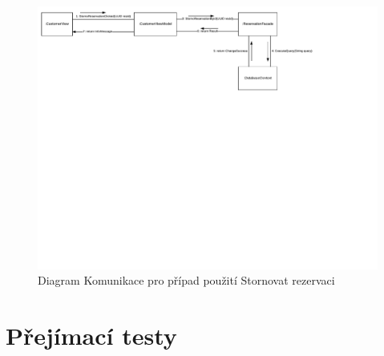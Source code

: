 \newpage
\begin{figure}[h!]
\begin{center}
\includegraphics[scale=0.75]{../02_Vysledne_modely/09_CommunicationDiagram.pdf}
\vspace{-250pt}
\caption{Diagram Komunikace pro případ použití Stornovat rezervaci}
\label{fig:communication09-1}
\end{center}
\end{figure}


\newpage
\begin{landscape}	
\end{landscape}
\newpage

\newpage
\section*{Přejímací testy}

